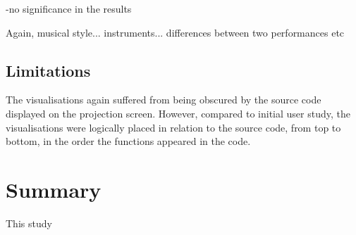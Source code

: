 -no significance in the results

Again, musical style... instruments... differences between two performances etc

\more

\subsection{Limitations}

The visualisations again suffered from being obscured by the source code displayed on the projection screen. However, compared to initial user study, the visualisations were logically placed in relation to the source code, from top to bottom, in the order the functions appeared in the code.

\section{Summary}

This study 
\more








